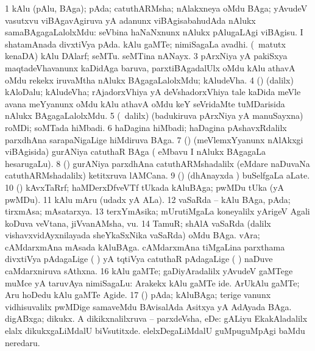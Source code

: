 \bentry
{}
\gl{\nA}
\bmng
\bnum
\num{1} kAlu (pAlu, BAga); pAda; catuthARMsha; nAlakxneya oMdu BAga; yAvudeV vasutxvu viBAgavAgiruva yA adanunx viBAgisabahudAda nAlukx samaBAgagaLalolxMdu:   seVbina haNaNxnunx nAlukx pAlugaLAgi viBAgisu.    I shatamAnada divxtiVya pAda.  kAlu gaMTe;  nimiSagaLa avadhi. 
 (\ame\ matutx kenaDA) 
\banum
{} kAlu DAlarf;  seMTu. 
  seMTina nANayx. 
\eanum
\numie
\num{3} pArxNiya yA pakiSxya maqtadeVhavanunx kaDidAga baruva, parxtiBAgadalUlx oMdu kAlu athavA oMdu rekekx iruvaMtha nAlukx BAgagaLalolxMdu; kAludeVha. 
\num{4} (\ca) (\bava dalilx) kAloDalu; kAludeVha; rAjadorxVhiya yA deVshadorxVhiya tale kaDida meVle avana meYyanunx oMdu kAlu athavA oMdu keY seVridaMte tuMDarisida nAlukx BAgagaLalolxMdu. 
\num{5} (\sA\ \bava dalilx) (badukiruva pArxNiya yA manuSayxna) roMDi; soMTada hiMbadi. 
\num{6} haDagina hiMbadi; haDagina pAshavxRdalilx parxdhAna sarapaNigaLige hiMdiruva BAga. 
\num{7} (\vaMlAM) (meVlemxYyanunx nAlAkxgi viBAgisida) gurANiya catuthaR BAga ( eMbavu I nAlukx BAgagaLa hesarugaLu). 
\num{8} (\vaMlAM) gurANiya parxdhAna catuthARMshadalilx (eMdare naDuvaNa catuthARMshadalilx) ketitxruva lAMCana. 
\num{9} (\birx) (dhAnayxda \vi)  buSelfgaLa aLate. 
\num{10} (\birx) kAvxTaRrf; haMDerxDfveVTf tUkada kAluBAga;  pwMDu tUka (yA \ame\  pwMDu). 
\num{11} kAlu mAru (udadx yA ALa). 
\num{12} vaSaRda -- kAlu BAga, pAda; tirxmAsa; mAsatarxya. 
\num{13} terxYmAsika; mUrutiMgaLa koneyalilx yArigeV Agali koDuva veVtana, jiVvanAMsha, \mo vu. 
\num{14} TamuR; shAlA vaSaRda (\ame dalilx vishavxvidAyxnilayada sheYkaSxNika vaSaRda) oMdu BAga. 
\banum
{} vAra; cAMdarxmAna mAsada kAluBAga. 
 cAMdarxmAna tiMgaLina parxthama divxtiVya pAdagaLige ( ) yA tqtiVya catuthaR pAdagaLige ( ) naDuve caMdarxniruva sAthxna. 
\eanum
\numie
\num{16} kAlu gaMTe; gaDiyAradalilx yAvudeV gaMTege muMce yA taruvAya  nimiSagaLu:  Arakekx kAlu gaMTe ide.   ArUkAlu gaMTe; Aru hoDedu kAlu gaMTe Agide. 
\num{17} (\birx) pAda; kAluBAga; terige \mo vanunx vidhisuvalilx  pwMDige samaveMdu BAvisalAda Asitxya yA AdAyada BAga. 
\banum
{} digABxga; dikukx. 
 A dikikxnalilxruva -- parxdeVsha, eDe:  gALiyu EkakAladalilx elalx dikukxgaLiMdalU biVsutitxde.  elelxDegaLiMdalU guMpuguMpAgi baMdu neredaru. 
